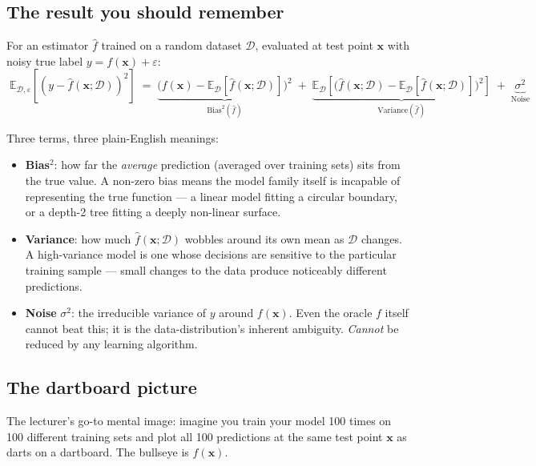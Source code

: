 \documentclass[11pt, a4paper]{article}
\begin{document}
\subsection{The result you should remember}

\begin{defbox}
For an estimator $\hat{f}$ trained on a random dataset $\mathcal{D}$, evaluated at test point $\mathbf{x}$ with noisy true label $y = f(\mathbf{x}) + \varepsilon$:
\[
\boxed{\;
\mathbb{E}_{\mathcal{D},\varepsilon}\!\left[(y - \hat f(\mathbf{x};\mathcal{D}))^2\right]
\;=\;
\underbrace{\bigl(f(\mathbf{x}) - \mathbb{E}_{\mathcal{D}}[\hat f(\mathbf{x};\mathcal{D})]\bigr)^2}_{\text{Bias}^2(\hat f)}
\;+\;
\underbrace{\mathbb{E}_{\mathcal{D}}\!\left[\bigl(\hat f(\mathbf{x};\mathcal{D}) - \mathbb{E}_{\mathcal{D}}[\hat f(\mathbf{x};\mathcal{D})]\bigr)^2\right]}_{\text{Variance}(\hat f)}
\;+\;
\underbrace{\sigma^2}_{\text{Noise}}
\;}
\]
\end{defbox}

Three terms, three plain-English meanings:

\begin{itemize}
  \item \textbf{Bias}$^2$: how far the \emph{average} prediction (averaged over training sets) sits from the true value. A non-zero bias means the model family itself is incapable of representing the true function — a linear model fitting a circular boundary, or a depth-2 tree fitting a deeply non-linear surface.
  \item \textbf{Variance}: how much $\hat{f}(\mathbf{x};\mathcal{D})$ wobbles around its own mean as $\mathcal{D}$ changes. A high-variance model is one whose decisions are sensitive to the particular training sample — small changes to the data produce noticeably different predictions.
  \item \textbf{Noise} $\sigma^2$: the irreducible variance of $y$ around $f(\mathbf{x})$. Even the oracle $f$ itself cannot beat this; it is the data-distribution's inherent ambiguity. \emph{Cannot} be reduced by any learning algorithm.
\end{itemize}

\subsection{The dartboard picture}

The lecturer's go-to mental image: imagine you train your model 100 times on 100 different training sets and plot all 100 predictions at the same test point $\mathbf{x}$ as darts on a dartboard. The bullseye is $f(\mathbf{x})$.
\end{document}

